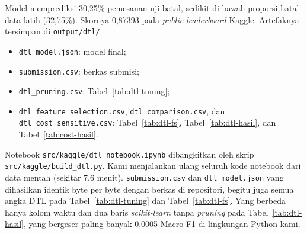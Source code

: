 Model memprediksi 30,25\% pemesanan uji batal, sedikit di bawah proporsi batal data latih (32,75\%).
Skornya 0,87393 pada \textit{public leaderboard} Kaggle. Artefaknya tersimpan di
\nolinkurl{output/dtl/}:
\begin{itemize}
	\item \texttt{dtl\_model.json}: model final;
	\item \texttt{submission.csv}: berkas submisi;
	\item \texttt{dtl\_pruning.csv}: Tabel~\ref{tab:dtl-tuning};
	\item \texttt{dtl\_feature\_selection.csv}, \texttt{dtl\_comparison.csv}, dan
	\texttt{dtl\_cost\_sensitive.csv}: Tabel~\ref{tab:dtl-fs}, Tabel~\ref{tab:dtl-hasil}, dan
	Tabel~\ref{tab:cost-hasil}.
\end{itemize}
Notebook \nolinkurl{src/kaggle/dtl_notebook.ipynb} dibangkitkan oleh skrip
\nolinkurl{src/kaggle/build_dtl.py}. Kami menjalankan ulang seluruh kode notebook dari data
mentah (sekitar 7,6 menit). \texttt{submission.csv} dan \texttt{dtl\_model.json} yang dihasilkan
identik byte per byte dengan berkas di repositori, begitu juga semua angka DTL pada
Tabel~\ref{tab:dtl-tuning} dan Tabel~\ref{tab:dtl-fs}. Yang berbeda hanya kolom waktu dan dua baris
\textit{scikit-learn} tanpa \textit{pruning} pada Tabel~\ref{tab:dtl-hasil}, yang bergeser paling
banyak 0,0005 Macro F1 di lingkungan Python kami.

